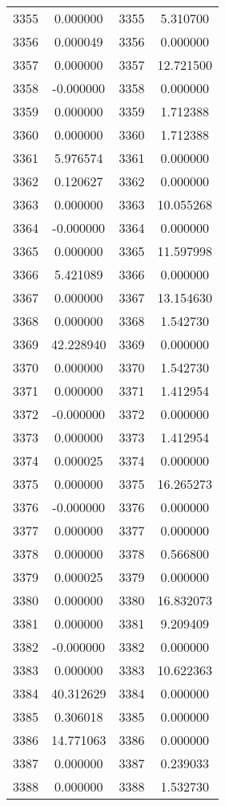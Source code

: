 \documentclass[12pt]{article}
\begin{document}
\begin{longtable}{@{}cccc@{}}
3355 & 0.000000 & 3355 & 5.310700 \\
3356 & 0.000049 & 3356 & 0.000000 \\
3357 & 0.000000 & 3357 & 12.721500 \\
3358 & -0.000000 & 3358 & 0.000000 \\
3359 & 0.000000 & 3359 & 1.712388 \\
3360 & 0.000000 & 3360 & 1.712388 \\
3361 & 5.976574 & 3361 & 0.000000 \\
3362 & 0.120627 & 3362 & 0.000000 \\
3363 & 0.000000 & 3363 & 10.055268 \\
3364 & -0.000000 & 3364 & 0.000000 \\
3365 & 0.000000 & 3365 & 11.597998 \\
3366 & 5.421089 & 3366 & 0.000000 \\
3367 & 0.000000 & 3367 & 13.154630 \\
3368 & 0.000000 & 3368 & 1.542730 \\
3369 & 42.228940 & 3369 & 0.000000 \\
3370 & 0.000000 & 3370 & 1.542730 \\
3371 & 0.000000 & 3371 & 1.412954 \\
3372 & -0.000000 & 3372 & 0.000000 \\
3373 & 0.000000 & 3373 & 1.412954 \\
3374 & 0.000025 & 3374 & 0.000000 \\
3375 & 0.000000 & 3375 & 16.265273 \\
3376 & -0.000000 & 3376 & 0.000000 \\
3377 & 0.000000 & 3377 & 0.000000 \\
3378 & 0.000000 & 3378 & 0.566800 \\
3379 & 0.000025 & 3379 & 0.000000 \\
3380 & 0.000000 & 3380 & 16.832073 \\
3381 & 0.000000 & 3381 & 9.209409 \\
3382 & -0.000000 & 3382 & 0.000000 \\
3383 & 0.000000 & 3383 & 10.622363 \\
3384 & 40.312629 & 3384 & 0.000000 \\
3385 & 0.306018 & 3385 & 0.000000 \\
3386 & 14.771063 & 3386 & 0.000000 \\
3387 & 0.000000 & 3387 & 0.239033 \\
3388 & 0.000000 & 3388 & 1.532730 \\

\end{longtable}
\end{document}
